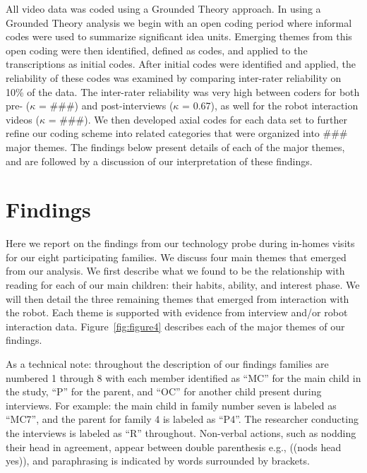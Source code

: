 \documentclass{sigchi}
\begin{document}
  All video data was coded using a Grounded Theory \cite{Glaser:1967,Charmaz:2012} approach. In using a Grounded Theory analysis we begin with an open coding period where informal codes were used to summarize significant idea units.  Emerging themes from this open coding were then identified, defined as codes, and applied to the transcriptions as initial codes. After initial codes were identified and applied, the reliability of these codes was examined by comparing inter-rater reliability on 10\% of the data. The inter-rater reliability was very high between coders for both pre- ($\kappa$ = \#\#\#) and post-interviews ($\kappa$ = 0.67), as well for the robot interaction videos ($\kappa$ = \#\#\#). We then developed axial codes for each data set to further refine our coding scheme into related categories that were organized into \#\#\# major themes. The findings below present details of each of the major themes, and are followed by a discussion of our interpretation of these findings.
 
\section{Findings}
Here we report on the findings from our technology probe during in-homes visits for our eight participating families. We discuss four main themes that emerged from our analysis. We first describe what we found to be the relationship with reading for each of our main children: their habits, ability, and interest phase. We will then detail the three remaining themes that emerged from interaction with the robot. Each theme is supported with evidence from interview and/or robot interaction data. Figure~\ref{fig:figure4} describes each of the major themes of our findings. 

As a technical note: throughout the description of our findings families are numbered 1 through 8 with each member identified as ``MC'' for the main child in the study, ``P'' for the parent, and ``OC'' for another child present during interviews. For example: the main child in family number seven is labeled as ``MC7'', and the parent for family 4 is labeled as ``P4''. The researcher conducting the interviews is labeled as ``R'' throughout. Non-verbal actions, such as nodding their head in agreement, appear between double parenthesis e.g., ((nods head yes)), and paraphrasing is indicated by words surrounded by brackets.
\end{document}
